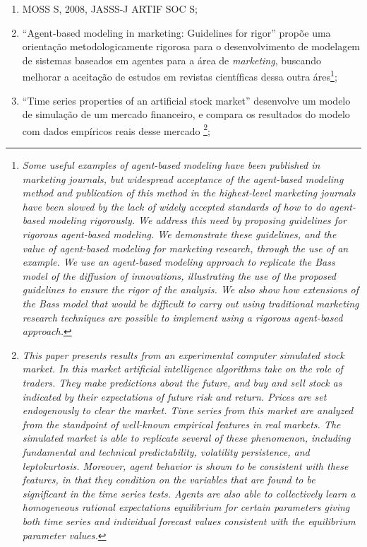 \begin{enumerate}
\item MOSS S, 2008, JASSS-J ARTIF SOC S;
\item ``Agent-based modeling in marketing: Guidelines for rigor'' propõe uma orientação metodologicamente rigorosa para o desenvolvimento de modelagem de sistemas baseados em agentes para a área de \textit{marketing}, buscando melhorar a aceitação de estudos em revistas científicas dessa outra áres\footnote{\textit{Some useful examples of agent-based modeling have been published in marketing journals, but widespread acceptance of the agent-based modeling method and publication of this method in the highest-level marketing journals have been slowed by the lack of widely accepted standards of how to do agent-based modeling rigorously. We address this need by proposing guidelines for rigorous agent-based modeling. We demonstrate these guidelines, and the value of agent-based modeling for marketing research, through the use of an example. We use an agent-based modeling approach to replicate the Bass model of the diffusion of innovations, illustrating the use of the proposed guidelines to ensure the rigor of the analysis. We also show how extensions of the Bass model that would be difficult to carry out using traditional marketing research techniques are possible to implement using a rigorous agent-based approach.}};
\item ``Time series properties of an artificial stock market'' desenvolve um modelo de simulação de um mercado financeiro, e compara os resultados do modelo com dados empíricos reais desse mercado \footnote{\textit{This paper presents results from an experimental computer simulated stock market. In this market artificial intelligence algorithms take on the role of traders. They make predictions about the future, and buy and sell stock as indicated by their expectations of future risk and return. Prices are set endogenously to clear the market. Time series from this market are analyzed from the standpoint of well-known empirical features in real markets. The simulated market is able to replicate several of these phenomenon, including fundamental and technical predictability, volatility persistence, and leptokurtosis. Moreover, agent behavior is shown to be consistent with these features, in that they condition on the variables that are found to be significant in the time series tests. Agents are also able to collectively learn a homogeneous rational expectations equilibrium for certain parameters giving both time series and individual forecast values consistent with the equilibrium parameter values.}};

\end{enumerate}
